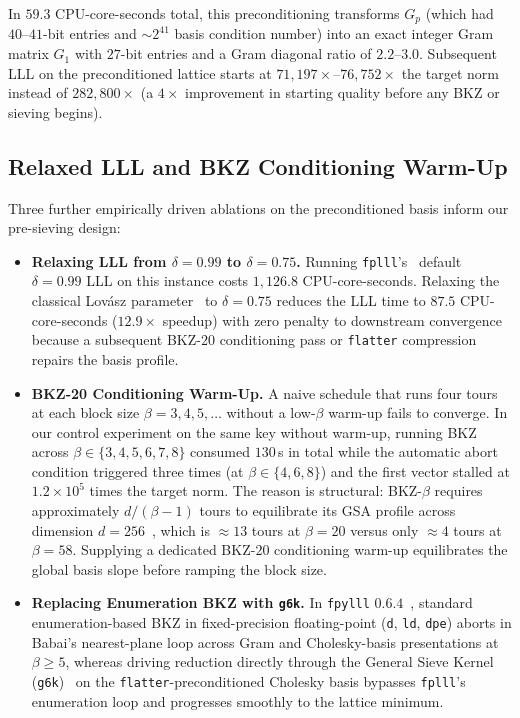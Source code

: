 \documentclass[11pt,a4paper]{article}
\theoremstyle{definition}
\begin{document}
In $59.3$ CPU-core-seconds total, this preconditioning transforms $G_p$ (which had $40$--$41$-bit entries and $\sim 2^{41}$ basis condition number) into an exact integer Gram matrix $G_1$ with $27$-bit entries and a Gram diagonal ratio of $2.2$--$3.0$. Subsequent LLL on the preconditioned lattice starts at $71{,}197\times$--$76{,}752\times$ the target norm instead of $282{,}800\times$ (a $4\times$ improvement in starting quality before any BKZ or sieving begins).

\subsection{Relaxed LLL and BKZ Conditioning Warm-Up}
Three further empirically driven ablations on the preconditioned basis inform our pre-sieving design:
\begin{itemize}[leftmargin=*]
\item \textbf{Relaxing LLL from $\delta=0.99$ to $\delta=0.75$.} Running \texttt{fplll}'s~\cite{fplll} default $\delta=0.99$ LLL on this instance costs $1{,}126.8$ CPU-core-seconds. Relaxing the classical Lov\'asz parameter~\cite{LLL82} to $\delta=0.75$ reduces the LLL time to $87.5$ CPU-core-seconds ($12.9\times$ speedup) with zero penalty to downstream convergence because a subsequent BKZ-$20$ conditioning pass or \texttt{flatter} compression repairs the basis profile.
\item \textbf{BKZ-20 Conditioning Warm-Up.} A naive schedule that runs four tours at each block size $\beta = 3, 4, 5, \dots$ without a low-$\beta$ warm-up fails to converge. In our control experiment on the same key without warm-up, running BKZ across $\beta \in \{3, 4, 5, 6, 7, 8\}$ consumed $130$\,s in total while the automatic abort condition triggered three times (at $\beta \in \{4, 6, 8\}$) and the first vector stalled at $1.2 \times 10^5$ times the target norm. The reason is structural: BKZ-$\beta$ requires approximately $d/(\beta - 1)$ tours to equilibrate its GSA profile across dimension $d=256$~\cite{CN11}, which is $\approx 13$ tours at $\beta=20$ versus only $\approx 4$ tours at $\beta=58$. Supplying a dedicated BKZ-$20$ conditioning warm-up equilibrates the global basis slope before ramping the block size.
\item \textbf{Replacing Enumeration BKZ with \texttt{g6k}.} In \texttt{fpylll} $0.6.4$~\cite{fplll}, standard enumeration-based BKZ in fixed-precision floating-point (\texttt{d}, \texttt{ld}, \texttt{dpe}) aborts in Babai's nearest-plane loop across Gram and Cholesky-basis presentations at $\beta \ge 5$, whereas driving reduction directly through the General Sieve Kernel (\texttt{g6k})~\cite{ADH+19} on the \texttt{flatter}-preconditioned Cholesky basis bypasses \texttt{fplll}'s enumeration loop and progresses smoothly to the lattice minimum.
\end{itemize}
\end{document}
